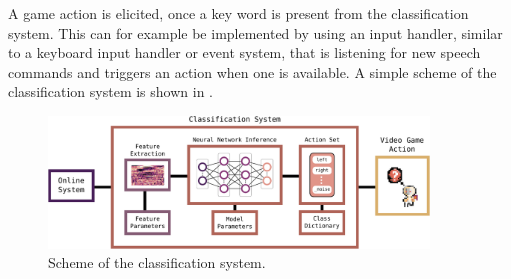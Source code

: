 A game action is elicited, once a key word is present from the classification system.
This can for example be implemented by using an input handler, similar to a keyboard input handler or event system, that is listening for new speech commands and triggers an action when one is available.
A simple scheme of the classification system is shown in .
\begin{figure}[!ht]
  \centering
  \includegraphics[width=0.9\textwidth]{./6_game/figs/game_system_classification.pdf}
  \caption{Scheme of the classification system.}
  \label{fig:game_system_classification}
\end{figure}
\FloatBarrier
\noindent

